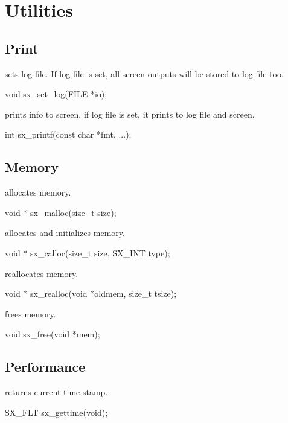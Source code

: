 \chapter{Utilities}

\section{Print}

 sets log file. If log file is set, all screen outputs will be stored to log file too.
\begin{evb}
void sx_set_log(FILE *io);
\end{evb}

 prints info to screen, if log file is set, it prints to log file and screen.
\begin{evb}
int sx_printf(const char *fmt, ...);
\end{evb}

\section{Memory}

 allocates memory.
\begin{evb}
void * sx_malloc(size_t size);
\end{evb}

 allocates and initializes memory.
\begin{evb}
void * sx_calloc(size_t size, SX_INT type);
\end{evb}

 reallocates memory.
\begin{evb}
void * sx_realloc(void *oldmem, size_t tsize);
\end{evb}

 frees memory.
\begin{evb}
void sx_free(void *mem);
\end{evb}

\section{Performance}

 returns current time stamp.
\begin{evb}
SX_FLT sx_gettime(void);
\end{evb}
